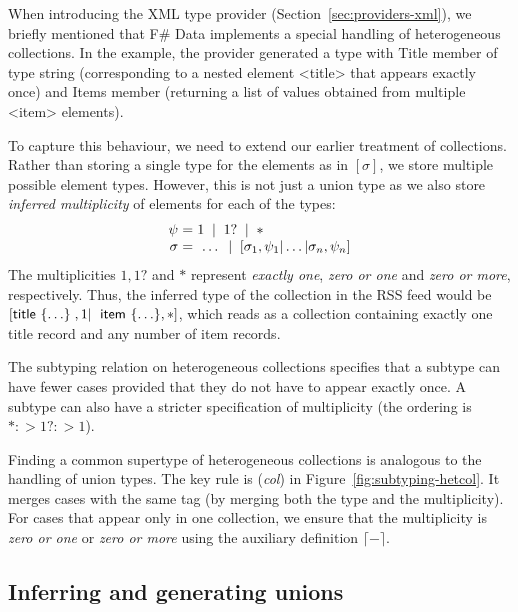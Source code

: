 \documentclass[10pt,preprint,clearpagebib]{sigplanconf}
\newcommand{\ident}[1]{\textnormal{\sffamily #1}}
\newcommand{\lsep}[0]{\;\; | \;\;}
\newcommand{\narrow}[1]{\hspace{-0.7em} #1 \hspace{-0.7em}}
\newcommand{\addopt}[1]{\lceil#1\rceil}
\begin{document}
When introducing the XML type provider (Section~\ref{sec:providers-xml}), we briefly mentioned 
that F\# Data implements a special handling of heterogeneous collections. In the example, the provider
generated a type with \ident{Title} member of type \ident{string} (corresponding to a nested element
{\ttfamily\small <title>} that appears exactly once) and \ident{Items} member (returning a list of
values obtained from multiple {\ttfamily\small <item>} elements).

To capture this behaviour, we need to extend our earlier treatment of collections. Rather than storing
a single type for the elements as in $[\sigma]$, we store multiple possible element types. However,
this is not just a union type as we also store \emph{inferred multiplicity} of elements for 
each of the types:
%
\begin{equation*}
\begin{array}{rcl}
 \psi &\narrow{=}& 1 \lsep 1? \lsep \ast \\
 \sigma &\narrow{=}& ~\ldots \lsep [\sigma_1, \psi_1 | \ldots | \sigma_n, \psi_n ]
\end{array}
\end{equation*}
%
The multiplicities $1, 1?$ and $\ast$ represent \emph{exactly one}, \emph{zero or one} and \emph{zero or more},
respectively. Thus, the inferred type of the collection in the RSS feed would be
$[\ident{title}~\{ \ldots \}\;,1|\;\ident{item}~\{ \ldots \},\ast]$, which reads as a collection
containing exactly one \ident{title} record and any number of \ident{item} records.

The subtyping relation on heterogeneous collections specifies that a subtype can have fewer cases 
provided that they do not have to appear exactly once. A subtype can also have a stricter specification
of multiplicity (the ordering is $\ast :> 1? :> 1$). 

Finding a common supertype of heterogeneous collections is analogous to the handling of union types.
The key rule is (\emph{col}) in Figure~\ref{fig:subtyping-hetcol}. It merges cases with the same tag
(by merging both the type and the multiplicity). For cases that appear only in one collection, we ensure
that the multiplicity is \emph{zero or one} or \emph{zero or more} using the auxiliary definition
$\addopt{-}$.

  
\subsection{Inferring and generating unions}
\label{sec:impl-unions}
\end{document}
